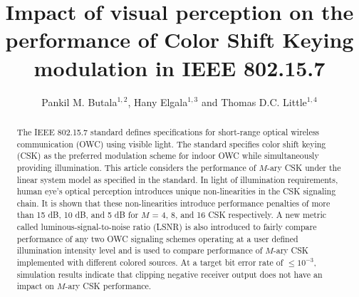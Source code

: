 \documentclass[10pt,letterpaper]{article}
\begin{document}
\title{Impact of visual perception on the performance of Color Shift Keying modulation in IEEE 802.15.7}

\author{Pankil M. Butala$^{1,2}$, Hany Elgala$^{1,3}$ and Thomas D.C. Little$^{1,4}$}

\address{$^{1}$Multimedia Communication Laboratory and Smart Lighting Engineering Research Center\\
Boston University, Boston, MA 02215, USA\\
\{$^2$pbutala,$^3$helgala,$^4$tdcl\}@bu.edu}



\begin{abstract}
The IEEE 802.15.7 standard defines specifications for short-range optical wireless communication (OWC) using visible light. The standard specifies color shift keying (CSK) as the preferred modulation scheme for indoor OWC while simultaneously providing illumination. This article considers the performance of $M$-ary CSK under the linear system model as specified in the standard. In light of illumination requirements, human eye's optical perception introduces unique non-linearities in the CSK signaling chain. It is shown that these non-linearities introduce performance penalties of more than 15 dB, 10 dB, and 5 dB for $M$ = 4, 8, and 16 CSK respectively. A new metric called luminous-signal-to-noise ratio (LSNR) is also introduced to fairly compare performance of any two OWC signaling schemes operating at a user defined illumination intensity level and is used to compare performance of $M$-ary CSK implemented with different colored sources. At a target bit error rate of $\leq 10^{-3}$, simulation results indicate that clipping negative receiver output does not have an impact on $M$-ary CSK performance.
\end{abstract}

\end{document}

